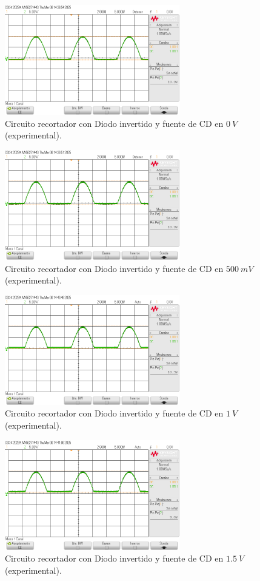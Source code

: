 \documentclass[journal]{IEEEtran}
\begin{document}
\begin{figure}[H]
        \centering
        \includegraphics[width=3in]{SignalExperimental_11.png}
        \caption{Circuito recortador con Diodo invertido y fuente de CD en $0~V$ (experimental).}
        \label{fig:SignalExperimental_11}
\end{figure}
\begin{figure}[H]
        \centering
        \includegraphics[width=3in]{SignalExperimental_12.png}
        \caption{Circuito recortador con Diodo invertido y fuente de CD en $500~mV$ (experimental).}
        \label{fig:SignalExperimental_12}
\end{figure}
\begin{figure}[H]
        \centering
        \includegraphics[width=3in]{SignalExperimental_13.png}
        \caption{Circuito recortador con Diodo invertido y fuente de CD en $1~V$ (experimental).}
        \label{fig:SignalExperimental_13}
\end{figure}
\begin{figure}[H]
        \centering
        \includegraphics[width=3in]{SignalExperimental_14.png}
        \caption{Circuito recortador con Diodo invertido y fuente de CD en $1.5~V$ (experimental).}
        \label{fig:SignalExperimental_14}
\end{figure}
\end{document}
